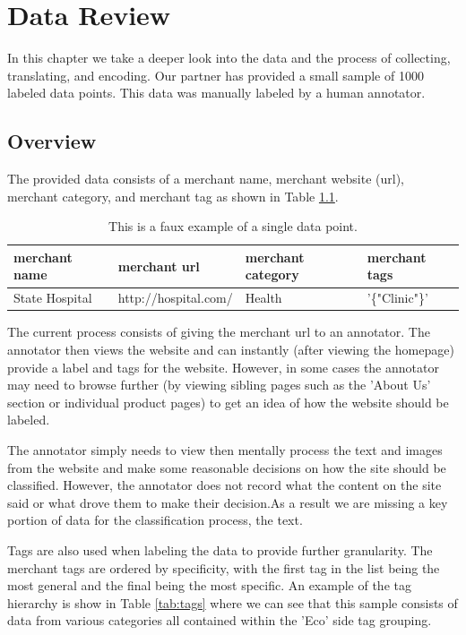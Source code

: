 \chapter{Data Review}

In this chapter we take a deeper look into the data and the process of collecting, translating, and encoding. Our partner has provided a small sample of 1000 labeled data points. This data was manually labeled by a human annotator. 

\section{Overview}

The provided data consists of a merchant name, merchant website (url), merchant category, and merchant tag as shown in Table \ref{tab:data_point}. 

\begin{table}[h]
\begin{tabular}{|l|l|l|l|}
\hline
merchant name            & merchant url            & merchant category & merchant tags           \\ \hline
State Hospital & http://hospital.com/ & Health   & '\{"Clinic"\}' \\ \hline
\end{tabular}
\caption{This is a faux example of a single data point.}
\label{tab:data_point}
\end{table}

The current process consists of giving the merchant url to an annotator. The annotator then views the website and can instantly (after viewing the homepage) provide a label and tags for the website. However, in some cases the annotator may need to browse further (by viewing sibling pages such as the 'About Us' section or individual product pages) to get an idea of how the website should be labeled. 

The annotator simply needs to view then mentally process the text and images from the website and make some reasonable decisions on how the site should be classified. However, the annotator does not record what the content on the site said or what drove them to make their decision.As a result we are missing a key portion of data for the classification process, the text. 

Tags are also used when labeling the data to provide further granularity. The merchant tags are ordered by specificity, with the first tag in the list being the most general and the final being the most specific. An example of the tag hierarchy is show in Table \ref{tab:tags} where we can see that this sample consists of data from various categories all contained within the 'Eco' side tag grouping.


